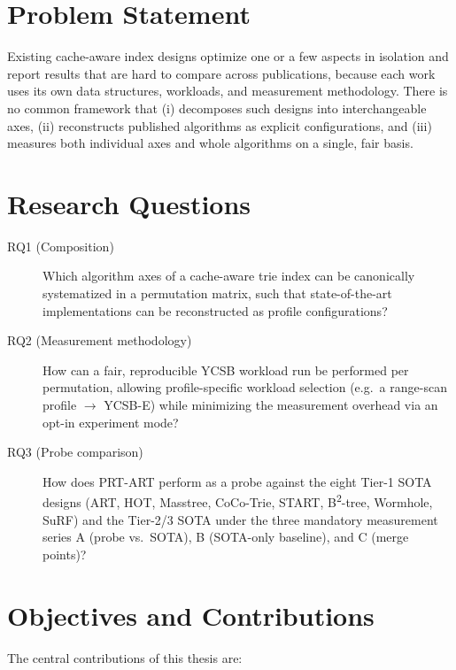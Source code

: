 \section{Problem Statement}\label{sec:problem}

Existing cache-aware index designs optimize one or a few aspects in isolation
and report results that are hard to compare across publications, because each
work uses its own data structures, workloads, and measurement methodology. There
is no common framework that (i) decomposes such designs into interchangeable
axes, (ii) reconstructs published algorithms as explicit configurations, and
(iii) measures both individual axes and whole algorithms on a single, fair basis.

\section{Research Questions}\label{sec:rqs}

\begin{description}
  \item[RQ1 (Composition)] Which algorithm axes of a cache-aware trie index can
        be canonically systematized in a permutation matrix, such that
        state-of-the-art implementations can be reconstructed as profile
        configurations?
  \item[RQ2 (Measurement methodology)] How can a fair, reproducible YCSB workload
        run be performed per permutation, allowing profile-specific workload
        selection (e.g.\ a range-scan profile $\to$ YCSB-E) while minimizing the
        measurement overhead via an opt-in experiment mode?
  \item[RQ3 (Probe comparison)] How does PRT-ART perform as a probe against the
        eight Tier-1 SOTA designs (ART, HOT, Masstree, CoCo-Trie, START,
        B\textsuperscript{2}-tree, Wormhole, SuRF) and the Tier-2/3 SOTA under the
        three mandatory measurement series A (probe vs.\ SOTA), B (SOTA-only
        baseline), and C (merge points)?
\end{description}

\section{Objectives and Contributions}\label{sec:contributions}

The central contributions of this thesis are:

